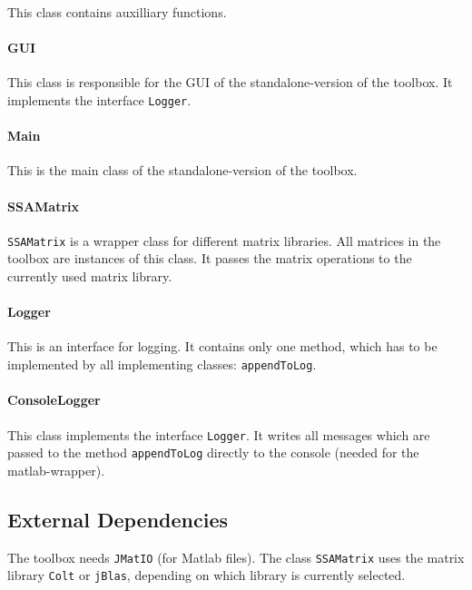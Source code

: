 \documentclass{article}
\newcommand{\1}{\ensuremath{\mathds{1}}}
\newcommand{\0}{\ensuremath{0}}
\begin{document}
This class contains auxilliary functions.

\paragraph{GUI}

This class is responsible for the GUI of the standalone-version of the toolbox. It implements the interface \texttt{Logger}.

\paragraph{Main}

This is the main class of the standalone-version of the toolbox.

\paragraph{SSAMatrix}

\texttt{SSAMatrix} is a wrapper class for different matrix libraries. All matrices in the toolbox are instances of this class. It passes the
matrix operations to the currently used matrix library.

\paragraph{Logger}

This is an interface for logging. It contains only one method, which has to be implemented by all implementing classes: \texttt{appendToLog}.

\paragraph{ConsoleLogger}

This class implements the interface \texttt{Logger}. It writes all messages which are passed to the method
\texttt{appendToLog} directly to the console (needed for the matlab-wrapper).

\subsection*{External Dependencies}

The toolbox needs \texttt{JMatIO} (for Matlab files). The class \texttt{SSAMatrix} uses the matrix library \texttt{Colt} or \texttt{jBlas}, depending on which library
is currently selected.

\end{document}
